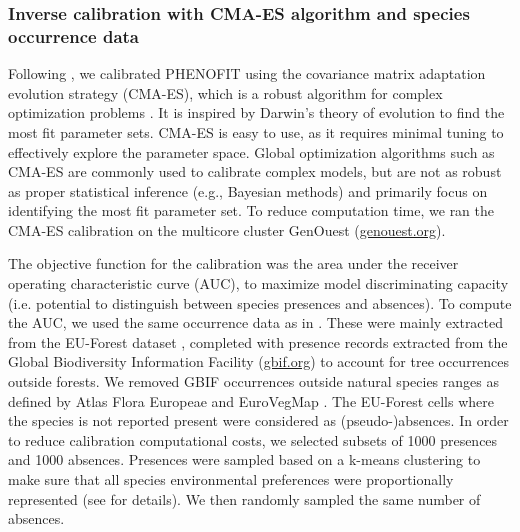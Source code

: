 \documentclass[preprint,12pt,authoryear]{elsarticle}
\begin{document}
\subsubsection{Inverse calibration with CMA-ES algorithm and species occurrence data}

Following \citet{VanderMeersch2023}, we calibrated PHENOFIT using the covariance matrix adaptation evolution strategy (CMA-ES), which  is a robust algorithm for complex optimization problems \citep{Hansen2001}. It is inspired by Darwin's theory of evolution to find the most fit parameter sets. \textcolor{customred}{CMA-ES is easy to use, as it requires minimal tuning to effectively explore the parameter space. Global optimization algorithms such as CMA-ES are commonly used to calibrate complex models, but are not as robust as proper statistical inference (e.g., Bayesian methods) and primarily focus on identifying the most fit parameter set. To reduce computation time}, we ran the CMA-ES calibration on the multicore cluster GenOuest (\url{genouest.org}).

The objective function for the calibration was the area under the receiver operating characteristic curve (AUC), to maximize model discriminating capacity (i.e. potential to distinguish between species presences and absences). To compute the AUC, we used the same occurrence data as in \citet{VanderMeersch2023}. These were mainly extracted from the EU-Forest dataset \citep{Mauri2017}, completed with presence records extracted from the Global Biodiversity Information Facility (\url{gbif.org}) to account for tree occurrences outside forests. We removed GBIF occurrences outside natural species ranges as defined by Atlas Flora Europeae \citep{AFE2005} and EuroVegMap \citep{EVM2003}. The EU-Forest cells where the species is not reported present were considered as (pseudo-)absences. In order to reduce calibration computational costs, we selected subsets of 1000 presences and 1000 absences. Presences were sampled based on a k-means clustering to make sure that all species environmental preferences were proportionally represented (see \citet{VanderMeersch2023} for details). \textcolor{customred}{We then randomly sampled the same number of absences.}
\end{document}

